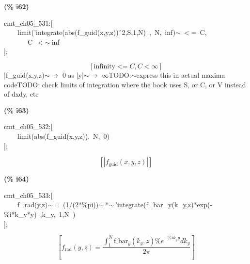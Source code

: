\documentclass[fleqn]{article}
\begin{document}
\noindent
\begin{minipage}[t]{4.000000em}\color{red}\bfseries
(\% i62)	
\end{minipage}
\begin{minipage}[t]{\textwidth}\color{blue}
cmt\_ch05\_531:[\\
\ \ \ \ limit('integrate(abs(f\_guid(x,y,z))\^\ 2,S,1,N)\ ,\ N,\ inf)\ensuremath{\sim\ }\ensuremath{<}=\ C,\\
\ \ \ \ \ \ \ C\ \ensuremath{<}\ensuremath{\sim\ }inf\\
];\\

\end{minipage}
\[\displaystyle \tag{\% o62} 
\left[ \ensuremath{\mathrm{infinity}}\operatorname{<  =}C\operatorname{,}C\operatorname{<  }\infty \right] \mbox{}
\]
|f\_guid(x,y,z)\ensuremath{\sim }\ensuremath{\longrightarrow} 0 as |y|\ensuremath{\sim }\ensuremath{\longrightarrow} \ensuremath{\infty}TODO:\ensuremath{\sim }express this in actual maxima codeTODO: check limits of integration where the book uses S, or C, or V instead of dxdy, etc


\noindent
\begin{minipage}[t]{4.000000em}\color{red}\bfseries
(\% i63)	
\end{minipage}
\begin{minipage}[t]{\textwidth}\color{blue}
cmt\_ch05\_532:[\\
\ \ \ \ limit(abs(f\_guid(x,y,z)),\ N,\ 0)\\
];
\end{minipage}
\[\displaystyle \tag{\% o63} 
\left[ \left| {f_{\ensuremath{\mathrm{guid}}}}\left( x\operatorname{,}y\operatorname{,}z\right) \right| \right] \mbox{}
\]


\noindent
\begin{minipage}[t]{4.000000em}\color{red}\bfseries
(\% i64)	
\end{minipage}
\begin{minipage}[t]{\textwidth}\color{blue}
cmt\_ch05\_533:[\\
\ \ \ \ f\_rad(y,z)\ensuremath{\sim\ }=\ (1/(2*\%pi))\ensuremath{\sim\ }*\ensuremath{\sim\ }'integrate(f\_bar\_y(k\_y,z)*exp(-\%i*k\_y*y)\ ,k\_y,\ 1,N\ )\\
];
\end{minipage}
\[\displaystyle \tag{\% o64} 
\left[ {f_{\ensuremath{\mathrm{rad}}}}\left( y\operatorname{,}z\right) =\frac{\int_{1}^{N}{\left. {{\ensuremath{\mathrm{f\_ bar}}}_y}\left( {k_y}\operatorname{,}z\right)  {{\% e}^{-\% i {k_y} y}}d{k_y}\right.}}{2 \ensuremath{\pi} }\right] \mbox{}
\]
\end{document}
